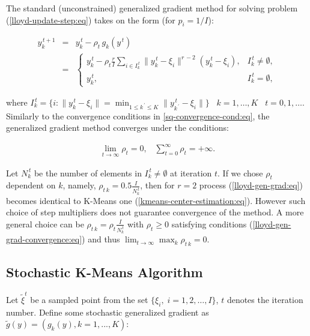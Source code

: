 The standard (unconstrained) generalized gradient method for solving problem (\ref{lloyd-update-step:eq}) takes on the form (for $ p_i = 1/I $):

\begin{eqnarray}
    \label{lloyd-gen-grad:eq}
    y_k^{\,t+1} &=& y_k^{\,t} - \rho_t \,g_k(y^{\,t}) \nonumber \\
                &=& \begin{cases}
        y_k^{\,t} - \rho_t \frac{r}{I} 
				\sum_{i \in I_k^{\,t}} \|y_k^{\,t} - \xi_i\|^{r\,-2}(y_k^{\,t} - \xi_i), 
				& I_k^{\,t} \neq \emptyset, \\
        y_k^{\,t}, & I_k^{\,t} = \emptyset,
    \end{cases}
\end{eqnarray}

\noindent where $ I_k^{\,t} = \{i: \| y_k^{\,t} - \xi_i \| = \min_{1 \leq  k^{\,\prime} \leq K} \| y_{k^{\,\prime}}^{\,t}-\xi_i \| \} \;\;\; k = 1 , \ldots , K \;\;\; t = 0, 1 , \ldots $. Similarly to the convergence conditions in \ref{sq-convergence-cond:eq}, the generalized gradient method converges under the conditions:

\begin{eqnarray}
    \label{lloyd-gen-grad-convergence:eq}
    \lim_{t\rightarrow\infty}\rho_t=0,\;\;\;\sum_{t=0}^\infty\rho_t=+\infty.
\end{eqnarray}

Let $ N_k^{\,t} $ be the number of elements in $ I_k^{\,t} \neq \emptyset $ at iteration $ t $. If we chose $ \rho_t $ dependent on $ k $, namely, $ \rho_{t\,k} = 0.5 \frac{I}{N_k^{\,t}} $, then for $ r=2$ process (\ref{lloyd-gen-grad:eq}) becomes identical to K-Means one (\ref{kmeans-center-estimation:eq}). However such choice of step multipliers does not guarantee convergence of the method. A more general choice can be $ \rho_{t\,k} = \rho_t \frac{I}{N_k^{\,t}} $ with $ \rho_t \geq 0 $ satisfying conditions (\ref{lloyd-gen-grad-convergence:eq}) and thus $ \lim_{t \to \infty} \max_k \rho_{t\,k} = 0 $.

\subsection{Stochastic K-Means Algorithm}

Let $\tilde{\xi}^t$ be a sampled point from the set $\{\xi_i,\;i=1,2,\ldots,I\}$, $t$ denotes the iteration number. Define some stochastic generalized gradient as $ \tilde{g}(y) = (g_k(y), k = 1, ..., K) $:

